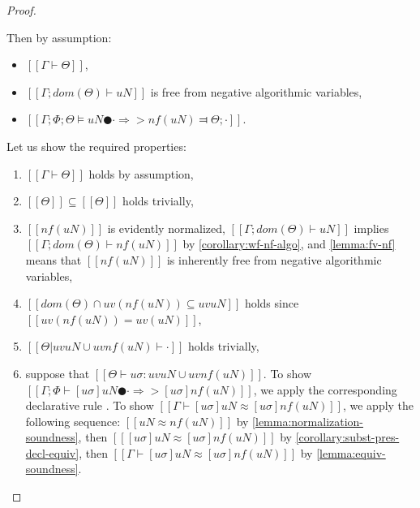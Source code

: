 \begin{proof}
\begin{caseof}
        \item {}
            Then by assumption:
            \begin{itemize}
                \item $[[Γ ⊢ Θ]]$,
                \item $[[Γ; dom(Θ) ⊢  uN]]$ is free from negative algorithmic variables,
                \item $[[Γ; Φ; Θ ⊨ uN ● · ⇒> nf(uN) ⫤ Θ; ·]]$.
            \end{itemize}

            Let us show the required properties: 
            \begin{enumerate}
                \item $[[Γ ⊢ Θ]]$ holds by assumption,
                \item $[[Θ]] \subseteq [[Θ]]$ holds trivially,
                \item $[[nf(uN)]]$ is evidently normalized, 
                    $[[Γ; dom(Θ) ⊢  uN]]$ implies $[[Γ; dom(Θ) ⊢  nf(uN)]]$ by 
                    \cref{corollary:wf-nf-algo},
                    and \cref{lemma:fv-nf} means that $[[nf(uN)]]$ is 
                    inherently free from negative algorithmic variables,
                \item $[[dom(Θ) ∩ uv(nf(uN)) ⊆ uv uN]]$
                    holds since $[[uv(nf(uN)) = uv(uN)]]$,
                \item $[[Θ|uv uN ∪ uv nf(uN) ⊢ ·]]$ holds trivially,
                \item suppose that $[[ Θ ⊢ uσ : uv uN ∪ uv nf(uN) ]]$.
                    To show $[[ Γ ; Φ ⊢ [uσ]uN ● · ⇒> [uσ]nf(uN) ]]$, we apply the corresponding 
                    declarative rule .
                    To show $[[ Γ ⊢ [uσ]uN ≈ [uσ]nf(uN) ]]$,
                    we apply the following sequence:
                    $[[uN ≈ nf(uN)]]$ by 
                    \cref{lemma:normalization-soundness},
                    then $[[ [uσ]uN ≈ [uσ]nf(uN) ]]$
                    by \cref{corollary:subst-pres-decl-equiv},
                    then $[[ Γ ⊢ [uσ]uN ≈ [uσ]nf(uN) ]]$
                    by \cref{lemma:equiv-soundness}. 
            \end{enumerate}


\end{caseof}
\end{proof}
